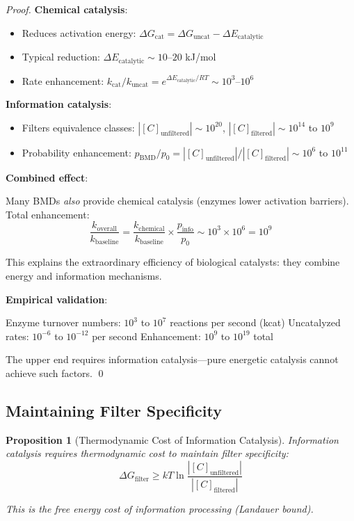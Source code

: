 \documentclass[11pt]{article}
\newtheorem{proposition}[theorem]{Proposition}
\theoremstyle{remark}
\begin{document}
\begin{proof}
\textbf{Chemical catalysis}:
\begin{itemize}
\item Reduces activation energy: $\Delta G_{\text{cat}} = \Delta G_{\text{uncat}} - \Delta E_{\text{catalytic}}$
\item Typical reduction: $\Delta E_{\text{catalytic}} \sim 10$--$20$ kJ/mol
\item Rate enhancement: $k_{\text{cat}}/k_{\text{uncat}} = e^{\Delta E_{\text{catalytic}}/RT} \sim 10^3$--$10^6$
\end{itemize}

\textbf{Information catalysis}:
\begin{itemize}
\item Filters equivalence classes: $|[C]_{\text{unfiltered}}| \sim 10^{20}$, $|[C]_{\text{filtered}}| \sim 10^{14}$ to $10^9$
\item Probability enhancement: $p_{\text{BMD}}/p_0 = |[C]_{\text{unfiltered}}|/|[C]_{\text{filtered}}| \sim 10^6$ to $10^{11}$
\end{itemize}

\textbf{Combined effect}:

Many BMDs \textit{also} provide chemical catalysis (enzymes lower activation barriers). Total enhancement:
\begin{equation}
\frac{k_{\text{overall}}}{k_{\text{baseline}}} = \frac{k_{\text{chemical}}}{k_{\text{baseline}}} \times \frac{p_{\text{info}}}{p_0} \sim 10^3 \times 10^6 = 10^9
\end{equation}

This explains the extraordinary efficiency of biological catalysts: they combine energy and information mechanisms.

\textbf{Empirical validation}:

Enzyme turnover numbers: $10^3$ to $10^7$ reactions per second (kcat)
Uncatalyzed rates: $10^{-6}$ to $10^{-12}$ per second
Enhancement: $10^9$ to $10^{19}$ total

The upper end requires information catalysis—pure energetic catalysis cannot achieve such factors. \qed
\end{proof}

\subsection{Maintaining Filter Specificity}

\begin{proposition}[Thermodynamic Cost of Information Catalysis]
\label{prop:bmd_thermodynamic_cost}
Information catalysis requires thermodynamic cost to maintain filter specificity:
\begin{equation}
\Delta G_{\text{filter}} \geq kT \ln \frac{|[C]_{\text{unfiltered}}|}{|[C]_{\text{filtered}}|}
\end{equation}

This is the free energy cost of information processing (Landauer bound).
\end{proposition}
\end{document}
